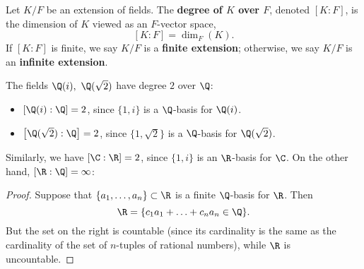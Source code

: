\documentclass[math1530-lecture-notes]{subfiles}
\begin{document}
\begin{definition}{}
  Let $K / F$ be an extension of fields. The \textbf{degree of $K$ over $F$}, denoted $\left[ K : F
  \right] $, is the dimension of $K$ viewed as an $F$-vector space, \[
    \left[ K : F \right] = \dim_F(K)
  .\] If $\left[ K : F \right] $ is finite, we say $K / F$ is a \textbf{finite extension};
  otherwise, we say $K / F$ is an \textbf{infinite extension}.
\end{definition}

\begin{example}
  The fields $\Q(i),\ \Q(\sqrt{2})$ have degree $2$ over $\Q$:
  \begin{itemize}
    \item $\left[ \Q(i) : \Q \right] =2$, since $\{ 1,i \}$ is a $\Q$-basis for $\Q(i)$.
    \item $\left[ \Q(\sqrt{2}) : \Q \right] =2$, since $\{ 1,\sqrt{2} \}$ is a $\Q$-basis for
      $\Q(\sqrt{2})$.
  \end{itemize}

  Similarly, we have $\left[ \C : \R \right] =2$, since $\{ 1,i \}$ is an $\R$-basis for $\C$. On
  the other hand, $\left[ \R : \Q \right] = \infty$:
  \begin{proof}[Proof]
    Suppose that $\{ a_1,\ldots,a_n \}\subset \R$ is a finite $\Q$-basis for $\R$. Then \[
      \R = \{ c_1a_1+\ldots+c_na_n\in \Q \}
    .\] But the set on the right is countable (since its cardinality is the same as the cardinality
    of the set of $n$-tuples of rational numbers), while $\R$ is uncountable.
  \end{proof}
  
\end{example}
\end{document}
